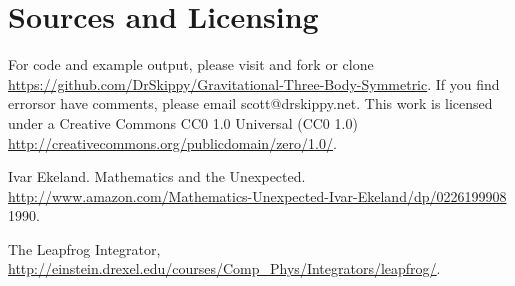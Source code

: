 \documentclass{article}
\begin{document}

\section{Sources and Licensing} 

For code and example output, please visit and fork or clone \url{https://github.com/DrSkippy/Gravitational-Three-Body-Symmetric}.
\noindent If you find errorsor have comments, please email scott@drskippy.net.
\noindent This work is licensed under a Creative Commons CC0 1.0 Universal (CC0 1.0) 
\noindent \url{http://creativecommons.org/publicdomain/zero/1.0/}.


\begin{thebibliography}{2013}

 Ivar Ekeland. Mathematics and the Unexpected.  \url{http://www.amazon.com/Mathematics-Unexpected-Ivar-Ekeland/dp/0226199908} 1990.

 The Leapfrog Integrator, \url{http://einstein.drexel.edu/courses/Comp_Phys/Integrators/leapfrog/}.

\end{thebibliography}
\end{document}
